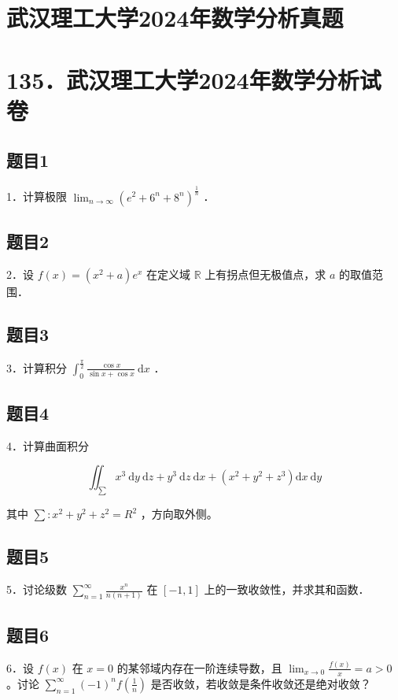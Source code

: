 \documentclass{article}
\begin{document}
\section*{武汉理工大学2024年数学分析真题}
\section*{135．武汉理工大学2024年数学分析试卷}

\subsection{题目1}
1．计算极限 \(\lim _{n \rightarrow \infty}\left(e^{2}+6^{n}+8^{n}\right)^{\frac{1}{n}}\) ．

\subsection{题目2}
2．设 \(f(x)=\left(x^{2}+a\right) e^{x}\) 在定义域 \(\mathbb{R}\) 上有拐点但无极值点，求 \(a\) 的取值范围．

\subsection{题目3}
3．计算积分 \(\int_{0}^{\frac{\pi}{2}} \frac{\cos x}{\sin x+\cos x} \mathrm{~d} x\) ．

\subsection{题目4}
4．计算曲面积分

\[
\iint_{\sum} x^{3} \mathrm{~d} y \mathrm{~d} z+y^{3} \mathrm{~d} z \mathrm{~d} x+\left(x^{2}+y^{2}+z^{3}\right) \mathrm{d} x \mathrm{~d} y
\]

其中 \(\sum: x^{2}+y^{2}+z^{2}=R^{2}\) ，方向取外侧。

\subsection{题目5}
5．讨论级数 \(\sum_{n=1}^{\infty} \frac{x^{n}}{n(n+1)}\) 在 \([-1,1]\) 上的一致收敛性，并求其和函数．

\subsection{题目6}
6．设 \(f(x)\) 在 \(x=0\) 的某邻域内存在一阶连续导数，且 \(\lim _{x \rightarrow 0} \frac{f(x)}{x}=a>0\) 。讨论 \(\sum_{n=1}^{\infty}(-1)^{n} f\left(\frac{1}{n}\right)\) 是否收敛，若收敛是条件收敛还是绝对收敛？
\end{document}
